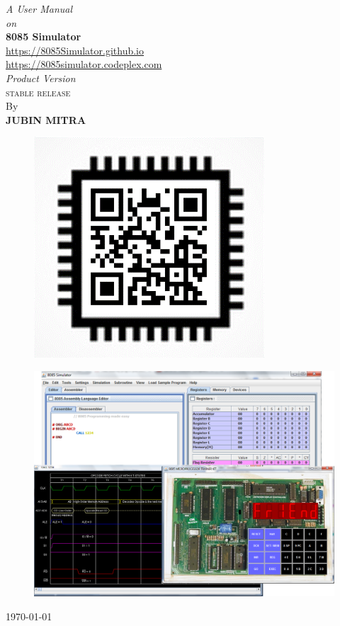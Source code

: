 \thispagestyle{empty}

\begin{center}
\vspace{0.03\textheight}
\textit{A User Manual\\}
\vspace{0.01\textheight}
\textit{on\\}
\vspace{0.03\textheight}
{\Huge\textbf{8085 Simulator
}}\\
{\url{https://8085Simulator.github.io}}\\
{\url{https://8085simulator.codeplex.com}}\\


\vspace{0.015\textheight}
\textit{Product Version \ver}\\
\textsc{stable release}
\vspace{0.015\textheight}
\\By\\
\textbf{\textsc{JUBIN MITRA}}\\
\begin{figure}[htbp]
	\centering
	\includegraphics[width=0.2\linewidth]{qr_code}
\end{figure} 
\vspace{0.02\textheight}
\begin{figure}[H]
\centering

\includegraphics[width=\linewidth]{"./top_page1"}
\end{figure}
\today
\end{center}


